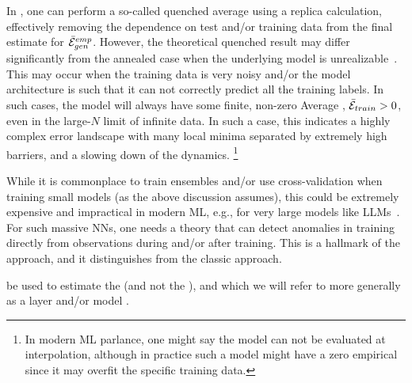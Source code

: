 In \STATMECH, one can perform a so-called quenched average using a replica calculation,
effectively removing the dependence on test and/or training data
from the final estimate for $\bar{\mathcal{E}}^{emp}_{gen}$.
However, the theoretical quenched result may differ significantly from the annealed case when the underlying model is unrealizable~\cite{SST92}. 
This may occur when the training data is very noisy and/or the model architecture is such that it can not correctly predict all the training labels.
In such cases, the model will always have some finite, non-zero Average \TrainingError, $\bar{\mathcal{E}}_{train} > 0$,
even in the large-$N$ limit of infinite data.  In such a case, this indicates
a highly complex error landscape with many local minima separated by extremely high barriers,
and a slowing down of the dynamics.%
\footnote{In modern ML parlance, one might say the model can not be evaluated at interpolation, although 
in practice such a model might have a zero empirical \TrainingError since it may overfit the specific training data.}

While it is commonplace to train ensembles and/or use cross-validation when training small models (as the above discussion assumes),
this could be extremely expensive and impractical in modern ML, e.g., for very large models like LLMs~\cite{LLMS}.
For such massive NNs, one needs a theory that can detect anomalies in training directly from observations during and/or after training.
This is a hallmark of the \SETOL approach, and it distinguishes \SETOL from the classic \STATMECH approach.



be used to estimate the \AverageGeneralizationAccuracy (and not the \Precision),
and which we will refer to more generally as a layer and/or model \Quality.



